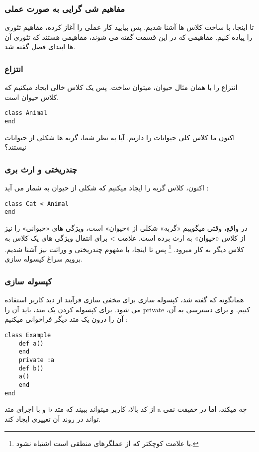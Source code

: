 \documentclass[11pt]{article}
\begin{document}
\subsubsection{مفاهیم شی گرایی به صورت عملی}
تا اینجا، با ساخت کلاس ها آشنا شدیم. پس بیایید کار عملی را آغاز کرده، مفاهیم تئوری را پیاده کنیم. مفاهیمی که در این قسمت گفته می شوند، مفاهیمی هستند که تئوری آن ها ابتدای فصل گفته شد. 

\subsubsection{انتزاع}
انتزاع 
را با همان مثال حیوان، میتوان ساخت. پس یک کلاس خالی ایجاد میکنیم که کلاس حیوان است.

\begin{latin}
\begin{verbatim}
class Animal
end
\end{verbatim}
\end{latin}
اکنون ما کلاس کلی حیوانات را داریم. آیا به نظر شما، گربه ها شکلی از حیوانات نیستند؟
\subsubsection{چندریختی و ارث بری}
اکنون، کلاس گربه را ایجاد میکنیم که شکلی از حیوان به شمار می آید :
\begin{latin}
\begin{verbatim}
class Cat < Animal
end
\end{verbatim}
\end{latin}
در واقع، وقتی میگوییم «گربه» شکلی از «حیوان» است، ویژگی های «حیوانی» را نیز از کلاس «حیوان» به ارث برده است. علامت > برای انتقال ویژگی های یک کلاس به کلاس دیگر به کار میرود.
\footnote{با علامت کوچکتر که از عملگرهای منطقی است اشتباه نشود.}
پس تا اینجا، با مفهوم چندریختی و وراثت نیز آشنا شدیم. برویم سراغ کپسوله سازی.
\subsubsection{کپسوله سازی}
همانگونه که گفته شد، کپسوله سازی برای مخفی سازی فرآیند از دید کاربر استفاده می شود. برای کپسوله کردن یک متد، باید آن را private کنیم. و برای دسترسی به آن، آن را درون یک متد دیگر فراخوانی میکنیم :
\begin{latin}
\begin{verbatim}
class Example
	def a()
	end
	private :a
	def b()
	a()
	end
end
\end{verbatim}
\end{latin}
و با اجرای متد b از کد بالا، کاربر میتواند ببیند که متد a چه میکند، اما در حقیقت نمی تواند در روند آن تغییری ایجاد کند. 
\end{document}
